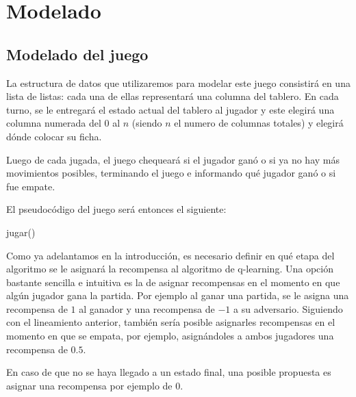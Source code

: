 \section{Modelado}

\subsection{Modelado del juego}

La estructura de datos que utilizaremos para modelar este juego consistirá en una lista de listas: cada una de ellas representará una columna del tablero. En cada turno, se le entregará el estado actual del tablero al jugador y este elegirá una columna numerada del $0$ al $n$ (siendo $n$ el numero de columnas totales) y elegirá dónde colocar su ficha.

Luego de cada jugada, el juego chequeará si el jugador ganó o si ya no hay más movimientos posibles, terminando el juego e informando qué jugador ganó o si fue empate.

El pseudocódigo del juego será entonces el siguiente:

\begin{algorithm}[h!]
\begin{algorithmic}[1]\parskip=1mm
 \caption{jugar()}
\end{algorithmic}
\end{algorithm}

Como ya adelantamos en la introducción, es necesario definir en qué etapa del algoritmo se le asignará la recompensa al algoritmo de q-learning. Una opción bastante sencilla e intuitiva es la de asignar recompensas en el momento en que algún jugador gana la partida. Por ejemplo al ganar una partida, se le asigna una recompensa de $1$ al ganador y una recompensa de $-1$ a su adversario. Siguiendo con el lineamiento anterior, también sería posible asignarles recompensas en el momento en que se empata, por ejemplo, asignándoles a ambos jugadores una recompensa de $0.5$.

En caso de que no se haya llegado a un estado final, una posible propuesta es asignar una recompensa por ejemplo de $0$.

